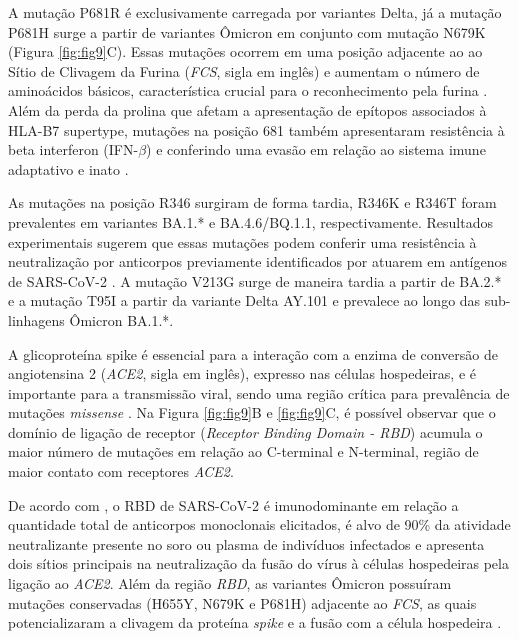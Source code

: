 \begin{justifying}
\begin{figure}
\end{figure}

\vspace{10mm}


A mutação P681R é exclusivamente carregada por variantes Delta, já a mutação P681H surge a partir de variantes Ômicron em conjunto com mutação N679K (Figura \ref{fig:fig9}C). Essas mutações ocorrem em uma posição adjacente ao ao Sítio de Clivagem da Furina (\textit{FCS}, sigla em inglês) e aumentam o número de aminoácidos básicos, característica crucial para o reconhecimento pela furina \cite{Harvey:2021}.  Além da perda da prolina que afetam a apresentação de epítopos associados à HLA-B7 supertype, mutações na posição 681 também apresentaram resistência à beta interferon (IFN-$\beta$) e conferindo uma evasão em relação ao sistema imune adaptativo e inato \cite{Hamelin:2022, Lista:2022}. 

As mutações na posição R346 surgiram de forma tardia, R346K e R346T foram prevalentes em variantes BA.1.* e BA.4.6/BQ.1.1, respectivamente. Resultados experimentais sugerem que essas mutações podem conferir uma resistência à neutralização por anticorpos previamente identificados por atuarem em antígenos de SARS-CoV-2  \cite{Cao:2022}. A mutação V213G surge de maneira tardia a partir de BA.2.* e  a mutação T95I a partir da variante Delta AY.101 e prevalece ao longo das sub-linhagens Ômicron BA.1.*. 

A glicoproteína spike é essencial para a interação com a enzima de conversão de angiotensina 2 (\textit{ACE2}, sigla em inglês), expresso nas células hospedeiras, e é importante para a transmissão viral, sendo uma região crítica para prevalência de mutações \textit{missense} \cite{Harvey:2021, Piccoli:2020, Toyoshima:2020}. Na Figura \ref{fig:fig9}B e \ref{fig:fig9}C, é possível observar que o domínio de ligação de receptor (\textit{Receptor Binding Domain - RBD}) acumula o maior número de mutações em relação ao C-terminal e N-terminal, região de maior contato com receptores \textit{ACE2}. 

De acordo com ,  o RBD de SARS-CoV-2 é imunodominante em relação a quantidade total de anticorpos monoclonais elicitados, é alvo de 90\% da atividade neutralizante presente no soro ou plasma de indivíduos infectados e apresenta dois sítios principais na neutralização da fusão do vírus à células hospedeiras pela ligação ao \textit{ACE2}. Além da região \textit{RBD}, as variantes Ômicron possuíram mutações conservadas (H655Y, N679K e P681H) adjacente ao \textit{FCS}, as quais potencializaram a clivagem da proteína \textit{spike} e a fusão com a célula hospedeira \cite{Viana:2022}.  


\end{justifying}
